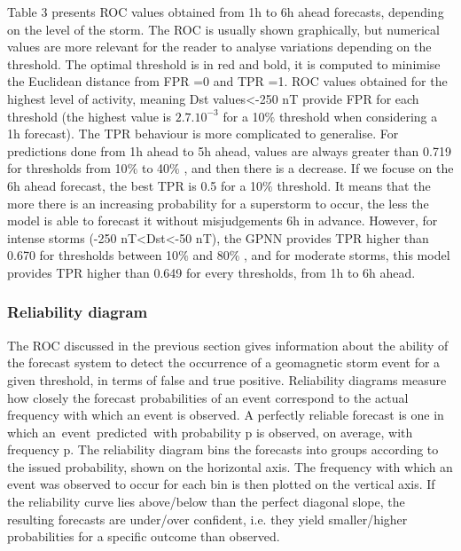 Table 3 presents ROC values obtained from 1h to 6h ahead forecasts, depending on the level of the storm. 
The ROC is usually shown graphically, but numerical values are more relevant for the reader to analyse 
variations depending on the threshold. The optimal threshold is in red and bold, it is computed to 
minimise the Euclidean distance from FPR =0 and TPR =1. ROC values obtained for the highest level of activity, 
meaning Dst values<-250 nT provide FPR for each threshold 
(the highest value is $2.7.10^{-3}$ for a 10$\%$  threshold when considering a 1h forecast). 
The TPR behaviour is more complicated to generalise. For predictions done from 1h ahead to 5h ahead, 
values are always greater than 0.719 for thresholds from 10$\%$  to 40$\%$ , and then there is a decrease. 
If we focuse on the 6h ahead forecast, the best TPR is 0.5 for a 10$\%$  threshold. It means that the more 
there is an increasing probability for a superstorm to occur, the less the model is able to forecast it 
without misjudgements 6h in advance. However, for intense storms (-250 nT<Dst<-50 nT), the GPNN provides 
TPR higher than 0.670 for thresholds between 10$\%$  and 80$\%$ , and for moderate storms, this model provides 
TPR higher than 0.649 for every thresholds, from 1h to 6h ahead. 


\subsubsection{Reliability diagram}


The ROC discussed in the previous section gives information about the ability of the forecast system to 
detect the occurrence of a geomagnetic storm event for a given threshold, in terms of false and true positive. 
Reliability diagrams measure how closely the forecast probabilities of an event correspond to the actual 
frequency with which an event is observed. A perfectly reliable forecast is one in which an\ event\ predicted\ 
with probability p is observed, on average, with frequency p. The reliability diagram bins the forecasts into 
groups according to the issued probability, shown on the horizontal axis. The frequency with which an event was 
observed to occur for each bin is then plotted on the vertical axis.  If the reliability curve lies above/below 
than the perfect diagonal slope, the resulting forecasts  are under/over confident, i.e. they yield  
smaller/higher probabilities for a specific outcome than observed. 


